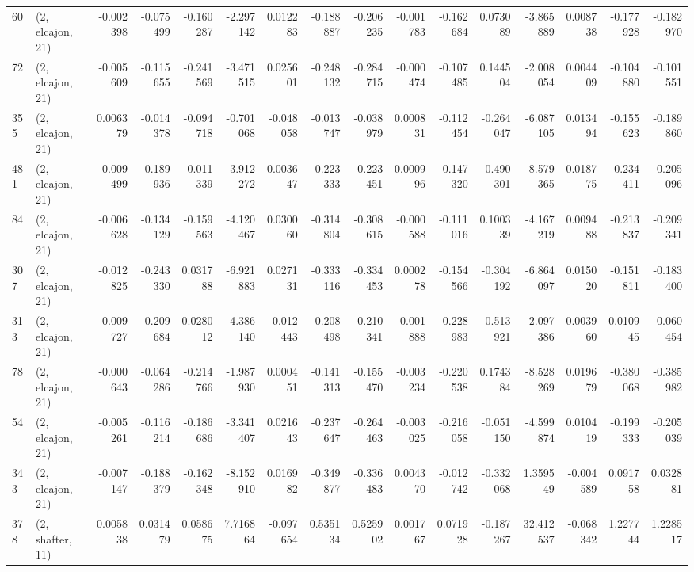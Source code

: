 \begin{tabular}{llrrrrrrrrrrrrrr}
60  &  (2, elcajon, 21) &  -0.002398 & -0.075499 & -0.160287 &   -2.297142 &  0.012283 &  -0.188887 & -0.206235 & -0.001783 & -0.162684 &  0.073089 &   -3.865889 &  0.008738 & -0.177928 & -0.182970 \\
72  &  (2, elcajon, 21) &  -0.005609 & -0.115655 & -0.241569 &   -3.471515 &  0.025601 &  -0.248132 & -0.284715 & -0.000474 & -0.107485 &  0.144504 &   -2.008054 &  0.004409 & -0.104880 & -0.101551 \\
355 &  (2, elcajon, 21) &   0.006379 & -0.014378 & -0.094718 &   -0.701068 & -0.048058 &  -0.013747 & -0.038979 &  0.000831 & -0.112454 & -0.264047 &   -6.087105 &  0.013494 & -0.155623 & -0.189860 \\
481 &  (2, elcajon, 21) &  -0.009499 & -0.189936 & -0.011339 &   -3.912272 &  0.003647 &  -0.223333 & -0.223451 &  0.000996 & -0.147320 & -0.490301 &   -8.579365 &  0.018775 & -0.234411 & -0.205096 \\
84  &  (2, elcajon, 21) &  -0.006628 & -0.134129 & -0.159563 &   -4.120467 &  0.030060 &  -0.314804 & -0.308615 & -0.000588 & -0.111016 &  0.100339 &   -4.167219 &  0.009488 & -0.213837 & -0.209341 \\
307 &  (2, elcajon, 21) &  -0.012825 & -0.243330 &  0.031788 &   -6.921883 &  0.027131 &  -0.333116 & -0.334453 &  0.000278 & -0.154566 & -0.304192 &   -6.864097 &  0.015020 & -0.151811 & -0.183400 \\
313 &  (2, elcajon, 21) &  -0.009727 & -0.209684 &  0.028012 &   -4.386140 & -0.012443 &  -0.208498 & -0.210341 & -0.001888 & -0.228983 & -0.513921 &   -2.097386 &  0.003960 &  0.010945 & -0.060454 \\
78  &  (2, elcajon, 21) &  -0.000643 & -0.064286 & -0.214766 &   -1.987930 &  0.000451 &  -0.141313 & -0.155470 & -0.003234 & -0.220538 &  0.174384 &   -8.528269 &  0.019679 & -0.380068 & -0.385982 \\
54  &  (2, elcajon, 21) &  -0.005261 & -0.116214 & -0.186686 &   -3.341407 &  0.021643 &  -0.237647 & -0.264463 & -0.003025 & -0.216058 & -0.051150 &   -4.599874 &  0.010419 & -0.199333 & -0.205039 \\
343 &  (2, elcajon, 21) &  -0.007147 & -0.188379 & -0.162348 &   -8.152910 &  0.016982 &  -0.349877 & -0.336483 &  0.004370 & -0.012742 & -0.332068 &    1.359549 & -0.004589 &  0.091758 &  0.032881 \\
378 &  (2, shafter, 11) &   0.005838 &  0.031479 &  0.058675 &    7.716864 & -0.097654 &   0.535134 &  0.525902 &  0.001767 &  0.071928 & -0.187267 &   32.412537 & -0.068342 &  1.227744 &  1.228517 \\

\end{tabular}
